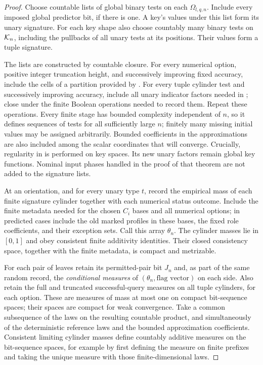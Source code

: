 \begin{proof}
Choose countable lists of global binary tests on each
$\Omega_{l,q,n}$. Include every imposed global predictor bit, if there is one. A key's values under this list form its unary signature. For each
key shape also choose countably many binary tests on $\mathcal K_n$, including
the pullbacks of all unary tests at its positions. Their values form a
tuple signature.

The lists are constructed by countable closure. For every numerical
option, positive integer truncation height, and successively improving
fixed accuracy, include the cells of a partition provided by
. For every tuple cylinder test and
successively improving accuracy, include all unary indicator factors
needed in ; close under the finite Boolean
operations needed to record them. Repeat these operations. Every finite
stage has bounded complexity independent of $n$, so it defines sequences
of tests for all sufficiently large $n$; finitely many missing initial
values may be assigned arbitrarily. Bounded coefficients in the
approximations are also included among the scalar coordinates that will
converge. Crucially, regularity in  is performed
on key spaces. Its new unary factors remain global key functions.
Nominal input phases handled in the proof of that theorem are not added
to the signature lists.

At an orientation, and for every unary type $t$, record the empirical
mass of each finite signature cylinder together with each numerical
status outcome. Include the finite metadata needed for the chosen
$C_i$ bases and all numerical options; in predicted cases include the
old marked profiles in these bases, the fixed role coefficients, and
their exception sets. Call this array $\theta_n$. The cylinder masses
lie in $[0,1]$ and obey consistent finite additivity identities. Their
closed consistency space, together with the finite metadata, is compact
and metrizable.

For each pair of leaves retain its permitted-pair bit $J_n$ and, as part
of the same random record, the \emph{conditional measures} of $(\theta_n,\text{flag vector})$ on
each side. Also retain the full and truncated successful-query measures
on all tuple cylinders, for each option. These are measures of mass at
most one on compact bit-sequence spaces; their spaces are compact for
weak convergence. Take a common subsequence of the laws on the resulting
countable product, and simultaneously of the deterministic reference
laws and the bounded approximation coefficients. Consistent limiting
cylinder masses define countably additive measures on the bit-sequence
spaces, for example by first defining the measure on finite prefixes
and taking the unique measure with those finite-dimensional laws.


\end{proof}
